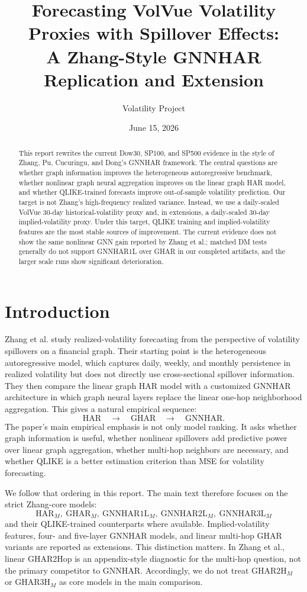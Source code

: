 \documentclass[11pt]{article}
\title{Forecasting VolVue Volatility Proxies with Spillover Effects:\\
\large A Zhang-Style GNNHAR Replication and Extension}
\author{Volatility Project}
\date{June 15, 2026}
\begin{document}
\maketitle

\begin{abstract}
This report rewrites the current Dow30, SP100, and SP500 evidence in the style of Zhang, Pu, Cucuringu, and Dong's GNNHAR framework.
The central questions are whether graph information improves the heterogeneous autoregressive benchmark, whether nonlinear graph neural aggregation improves on the linear graph HAR model, and whether QLIKE-trained forecasts improve out-of-sample volatility prediction.
Our target is not Zhang's high-frequency realized variance.
Instead, we use a daily-scaled VolVue 30-day historical-volatility proxy and, in extensions, a daily-scaled 30-day implied-volatility proxy.
Under this target, QLIKE training and implied-volatility features are the most stable sources of improvement.
The current evidence does not show the same nonlinear GNN gain reported by Zhang et al.; matched DM tests generally do not support GNNHAR1L over GHAR in our completed artifacts, and the larger scale runs show significant deterioration.
\end{abstract}

\section{Introduction}

Zhang et al. study realized-volatility forecasting from the perspective of volatility spillovers on a financial graph.
Their starting point is the heterogeneous autoregressive model, which captures daily, weekly, and monthly persistence in realized volatility but does not directly use cross-sectional spillover information.
They then compare the linear graph HAR model with a customized GNNHAR architecture in which graph neural layers replace the linear one-hop neighborhood aggregation.
This gives a natural empirical sequence:
\[
  \mathrm{HAR}
  \quad \longrightarrow \quad
  \mathrm{GHAR}
  \quad \longrightarrow \quad
  \mathrm{GNNHAR}.
\]
The paper's main empirical emphasis is not only model ranking.
It asks whether graph information is useful, whether nonlinear spillovers add predictive power over linear graph aggregation, whether multi-hop neighbors are necessary, and whether QLIKE is a better estimation criterion than MSE for volatility forecasting.

We follow that ordering in this report.
The main text therefore focuses on the strict Zhang-core models:
\[
  \mathrm{HAR}_M,\ \mathrm{GHAR}_M,\ \mathrm{GNNHAR1L}_M,\ \mathrm{GNNHAR2L}_M,\ \mathrm{GNNHAR3L}_M
\]
and their QLIKE-trained counterparts where available.
Implied-volatility features, four- and five-layer GNNHAR models, and linear multi-hop GHAR variants are reported as extensions.
This distinction matters.
In Zhang et al., linear GHAR2Hop is an appendix-style diagnostic for the multi-hop question, not the primary competitor to GNNHAR.
Accordingly, we do not treat \(\mathrm{GHAR2H}_M\) or \(\mathrm{GHAR3H}_M\) as core models in the main comparison.
\end{document}
